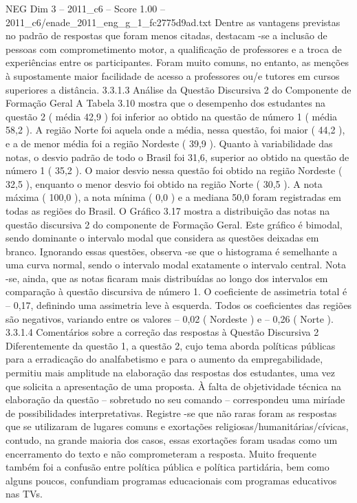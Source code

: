 \begin{textsample}{NEG Dim 3 – 2011\_c6 – Score 1.00 – 2011\_c6/enade\_2011\_eng\_g\_1\_fc2775d9ad.txt}
Dentre as vantagens previstas no padrão de respostas que foram menos citadas, destacam -se a inclusão de pessoas com comprometimento motor, a qualificação de professores e a troca de experiências entre os participantes.
Foram muito comuns, no entanto, as menções à supostamente maior facilidade de acesso a professores ou/e tutores em cursos superiores a distância. 3.3.1.3 Análise da Questão Discursiva 2 do Componente de Formação Geral A Tabela 3.10 mostra que o desempenho dos estudantes na questão 2 ( média 42,9 ) foi inferior ao obtido na questão de número 1 ( média 58,2 ).
A região Norte foi aquela onde a média, nessa questão, foi maior ( 44,2 ), e a de menor média foi a região Nordeste ( 39,9 ).
Quanto à variabilidade das notas, o desvio padrão de todo o Brasil foi 31,6, superior ao obtido na questão de número 1 ( 35,2 ).
O maior desvio nessa questão foi obtido na região Nordeste ( 32,5 ), enquanto o menor desvio foi obtido na região Norte ( 30,5 ).
A nota máxima ( 100,0 ), a nota mínima ( 0,0 ) e a mediana 50,0 foram registradas em todas as regiões do Brasil.
O Gráfico 3.17 mostra a distribuição das notas na questão discursiva 2 do componente de Formação Geral.
Este gráfico é bimodal, sendo dominante o intervalo modal que considera as questões deixadas em branco.
Ignorando essas questões, observa -se que o histograma é semelhante a uma curva normal, sendo o intervalo modal exatamente o intervalo central.
Nota -se, ainda, que as notas ficaram mais distribuídas ao longo dos intervalos em comparação à questão discursiva de número 1.
O coeficiente de assimetria total é – 0,17, definindo uma assimetria leve à esquerda.
Todos os coeficientes das regiões são negativos, variando entre os valores – 0,02 ( Nordeste ) e – 0,26 ( Norte ). 3.3.1.4 Comentários sobre a correção das respostas à Questão Discursiva 2 Diferentemente da questão 1, a questão 2, cujo tema aborda políticas públicas para a erradicação do analfabetismo e para o aumento da empregabilidade, permitiu mais amplitude na elaboração das respostas dos estudantes, uma vez que solicita a apresentação de uma proposta.
À falta de objetividade técnica na elaboração da questão – sobretudo no seu comando – correspondeu uma miríade de possibilidades interpretativas.
Registre -se que não raras foram as respostas que se utilizaram de lugares comuns e exortações religiosas/humanitárias/cívicas, contudo, na grande maioria dos casos, essas exortações foram usadas como um encerramento do texto e não comprometeram a resposta.
Muito frequente também foi a confusão entre política pública e política partidária, bem como alguns poucos, confundiam programas educacionais com programas educativos nas TVs.

\end{textsample}
